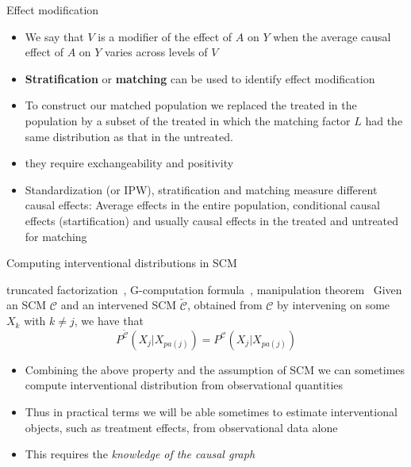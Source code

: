 \documentclass{beamer}
\begin{document}
\begin{frame}{Effect modification}

  \begin{itemize}
    \item We say that $V$ is a modifier of the effect of $A$ on $Y$
      when the average causal effect of $A$ on $Y$ varies across levels of $V$
    \item \textbf{Stratification} or \textbf{matching} can be used to identify effect modification
    \item<2-> To construct our matched population we replaced the treated in the 
      population by a subset of the treated in which the matching factor $L$ had the
      same distribution as that in the untreated.
    \item<3-> they require exchangeability and positivity
    \item<4-> Standardization (or IPW), stratification and matching measure different
      causal effects: Average effects in the entire population, conditional causal effects (startification) and usually causal effects in the treated and untreated for matching
  \end{itemize}

\end{frame}

\begin{frame}{Computing interventional distributions in SCM}
  \begin{block}{\small truncated factorization~\citep{pearl1993belief},
    G-computation formula~\citep{robins1986new},
    manipulation theorem~\citep{spirtes2000causation}}
    Given an SCM $\mathcal{C}$ and an intervened SCM $\tilde{\mathcal{C}}$, obtained
    from $\mathcal{C}$ by intervening on some $X_k$ with $k \neq j$, we have that
    \[P^{\tilde{\mathcal{C}}}(X_j |  X_{pa(j)}) = P^{\mathcal{C}}(X_j | X_{pa(j)})\]

  \end{block}
  \begin{itemize}
    \item<1-> Combining the above property and the assumption of SCM we can sometimes
      compute interventional distribution from observational quantities
    \item<2-> Thus in practical terms we will be able sometimes to
      estimate interventional objects, such as treatment effects, from
      observational data alone
    \item<3-> This requires the \emph{knowledge of the causal graph}
  \end{itemize}

\end{frame}
\end{document}
